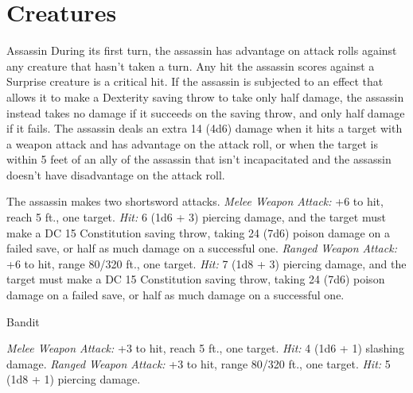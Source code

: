 \documentclass[10pt,a4paper,twoside,twocolumn,openany,bg=print,nodeprecatedcode]{dndbook}
\begin{document}
\chapter{Creatures}

\begin{DndMonster}[float*=t]{Assassin}
\DndMonsterBasics[
armor-class = {15 (studded leather armor)},
hit-points = {\DndDice{12d8 + 24}},
speed = {30 ft.}
]
\DndMonsterAbilityScores[
 str = 11,
 dex = 16,
 con = 14,
 int = 13,
 wis = 11,
 cha = 10
]
\DndMonsterDetails[
saving-throws = {Dex +6, Int +4},
skills = {Acrobatics +6, Deception +3, Perception +3, Stealth +9},
damage-resistances = {poison},
languages = {Thieves' cant plus any two languages},
challenge = 8,
]
During its first turn, the assassin has advantage on attack rolls against any creature that hasn't taken a turn. Any hit the assassin scores against a Surprise creature is a critical hit.
If the assassin is subjected to an effect that allows it to make a Dexterity saving throw to take only half damage, the assassin instead takes no damage if it succeeds on the saving throw, and only half damage if it fails.
The assassin deals an extra 14 (4d6) damage when it hits a target with a weapon attack and has advantage on the attack roll, or when the target is within 5 feet of an ally of the assassin that isn't incapacitated and the assassin doesn't have disadvantage on the attack roll.
\par
{}
The assassin makes two shortsword attacks.
\textsl{Melee Weapon Attack:} +6 to hit, reach 5 ft., one target. \textsl{Hit:} 6 (1d6 + 3) piercing damage, and the target must make a DC 15 Constitution saving throw, taking 24 (7d6) poison damage on a failed save, or half as much damage on a successful one.
\textsl{Ranged Weapon Attack:} +6 to hit, range 80/320 ft., one target. \textsl{Hit:} 7 (1d8 + 3) piercing damage, and the target must make a DC 15 Constitution saving throw, taking 24 (7d6) poison damage on a failed save, or half as much damage on a successful one.
\end{DndMonster}



\begin{DndMonster}[float*=t]{Bandit}
\DndMonsterBasics[
armor-class = {12 (leather armor)},
hit-points = {\DndDice{2d8 + 2}},
speed = {30 ft.}
]
\DndMonsterAbilityScores[
 str = 11,
 dex = 12,
 con = 12,
 int = 10,
 wis = 10,
 cha = 10
]
\DndMonsterDetails[
languages = {any one language (usually Common)},
challenge = 1/8,
]
\par
{}
\textsl{Melee Weapon Attack:} +3 to hit, reach 5 ft., one target. \textsl{Hit:} 4 (1d6 + 1) slashing damage.
\textsl{Ranged Weapon Attack:} +3 to hit, range 80/320 ft., one target. \textsl{Hit:} 5 (1d8 + 1) piercing damage.
\end{DndMonster}
\end{document}
